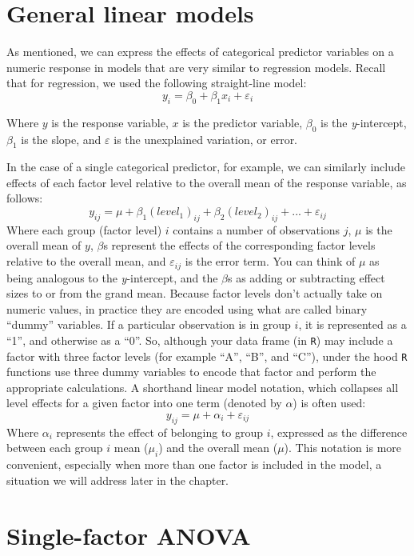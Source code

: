 \documentclass[]{book}
\begin{document}
\hypertarget{general-linear-models}{%
\section{General linear models}\label{general-linear-models}}

As mentioned, we can express the effects of categorical predictor variables on a numeric response in models that are very similar to regression models. Recall that for regression, we used the following straight-line model:
\[y_i=\beta_0+\beta_1x_i+\varepsilon_i\]

Where \(y\) is the response variable, \(x\) is the predictor variable, \(\beta_0\) is the \emph{y}-intercept, \(\beta_1\) is the slope, and \(\varepsilon\) is the unexplained variation, or error.

In the case of a single categorical predictor, for example, we can similarly include effects of each factor level relative to the overall mean of the response variable, as follows:
\[y_{ij}=\mu+\beta_1(level_1)_{ij}+\beta_2(level_2)_{ij}+...+\varepsilon_{ij}\]
Where each group (factor level) \(i\) contains a number of observations \(j\), \(\mu\) is the overall mean of \(y\), \(\beta\)s represent the effects of the corresponding factor levels relative to the overall mean, and \(\varepsilon_{ij}\) is the error term. You can think of \(\mu\) as being analogous to the \emph{y}-intercept, and the \(\beta\)s as adding or subtracting effect sizes to or from the grand mean. Because factor levels don't actually take on numeric values, in practice they are encoded using what are called binary ``dummy'' variables. If a particular observation is in group \(i\), it is represented as a ``1'', and otherwise as a ``0''. So, although your data frame (in \texttt{R}) may include a factor with three factor levels (for example ``A'', ``B'', and ``C''), under the hood \texttt{R} functions use three dummy variables to encode that factor and perform the appropriate calculations. A shorthand linear model notation, which collapses all level effects for a given factor into one term (denoted by \(\alpha\)) is often used:
\[y_{ij}=\mu+\alpha_i+\varepsilon_{ij}\]
Where \(\alpha_i\) represents the effect of belonging to group \(i\), expressed as the difference between each group \(i\) mean (\(\mu_i\)) and the overall mean (\(\mu\)). This notation is more convenient, especially when more than one factor is included in the model, a situation we will address later in the chapter.

\hypertarget{single-factor-anova}{%
\section{Single-factor ANOVA}\label{single-factor-anova}}
\end{document}
